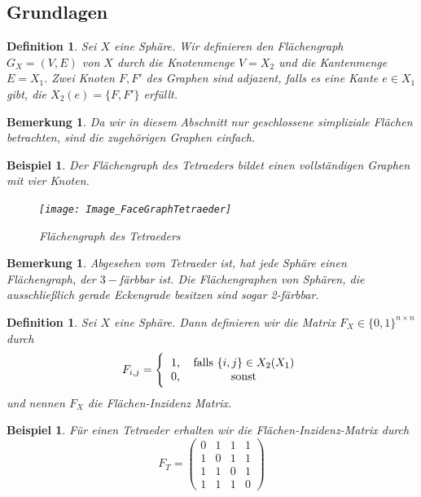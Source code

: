 \documentclass[12pt,titlepage,twoside,cleardoublepage]{article}
\theoremstyle{nummermitklammern}
\newtheorem{bsp}[temp]{Beispiel}
\newtheorem{definition}[temp]{Definition}
\newtheorem{bemerkung}[temp]{Bemerkung}
\newtheorem{definition}[zahl]{Definition}
\newtheorem{bsp}[zahl]{Beispiel}
\newtheorem{bemerkung}[zahl]{Bemerkung}
\numberwithin{equation}{section}
\begin{document}
\subsection{Grundlagen}
\begin{definition}
Sei $X$ eine Sphäre. Wir definieren den Flächengraph $G_X=(V,E)$ von $X$ durch die Knotenmenge $V=X_2$ und die Kantenmenge $E=X_1.$ Zwei Knoten $F,F'$ des Graphen sind adjazent, falls es eine Kante $e\in X_1$ gibt, die $X_2(e)=\{F,F'\}$ erfüllt. 
\end{definition}
\begin{bemerkung}
Da wir in diesem Abschnitt nur geschlossene simpliziale Flächen betrachten, sind die zugehörigen Graphen einfach. 
\end{bemerkung}
\begin{bsp}
Der Flächengraph des Tetraeders bildet einen vollständigen Graphen mit vier Knoten.
\begin{figure}[H]
\begin{center}
\texttt{[image: Image\_FaceGraphTetraeder]}
\end{center}
\caption{Flächengraph des Tetraeders}
\end{figure}
\end{bsp}
\begin{bemerkung}
Abgesehen vom Tetraeder ist, hat jede Sphäre einen  Flächengraph, der $3-$färbbar ist. Die Flächengraphen von Sphären, die ausschließlich gerade Eckengrade besitzen sind sogar 2-färbbar.
\end{bemerkung}
\begin{definition}
Sei $X$ eine Sphäre. Dann definieren wir die Matrix 
$F_X\in \{0,1\}^{n \times n}$ durch
\[
F_{i,j}=
\Biggl\{
\begin{tabular}[l]{lcr}
1,&\textcolor{black}{falls $\{i,j\}\in X_2(X_1)$} \\
0,& sonst\\
\end{tabular}
\] und nennen $F_X$ die Flächen-Inzidenz Matrix. 
\end{definition}
\begin{bsp}
Für einen Tetraeder erhalten wir die Flächen-Inzidenz-Matrix  durch  
\[
F_T=
\left( \begin{array}{rrrrrrrr}
0 & 1 & 1 & 1 \\ 
1 & 0 & 1 & 1 \\
1 & 1 & 0 & 1 \\
1 & 1 & 1 & 0  
\end{array}
\right)
\]

\end{bsp}
\end{document}

